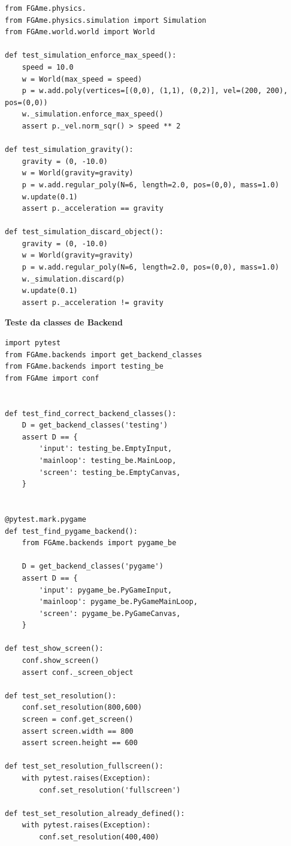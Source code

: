 \begin{anexosenv}
\begin{lstlisting}
from FGAme.physics.
from FGAme.physics.simulation import Simulation
from FGAme.world.world import World

def test_simulation_enforce_max_speed():
    speed = 10.0
    w = World(max_speed = speed)
    p = w.add.poly(vertices=[(0,0), (1,1), (0,2)], vel=(200, 200), pos=(0,0))
    w._simulation.enforce_max_speed()
    assert p._vel.norm_sqr() > speed ** 2

def test_simulation_gravity():
    gravity = (0, -10.0)
    w = World(gravity=gravity)
    p = w.add.regular_poly(N=6, length=2.0, pos=(0,0), mass=1.0)
    w.update(0.1)
    assert p._acceleration == gravity

def test_simulation_discard_object():
    gravity = (0, -10.0)
    w = World(gravity=gravity)
    p = w.add.regular_poly(N=6, length=2.0, pos=(0,0), mass=1.0)
    w._simulation.discard(p)
    w.update(0.1)
    assert p._acceleration != gravity
\end{lstlisting}


{\LARGE \textbf{Teste da classes de Backend}}

\begin{lstlisting}
import pytest
from FGAme.backends import get_backend_classes
from FGAme.backends import testing_be
from FGAme import conf


def test_find_correct_backend_classes():
    D = get_backend_classes('testing')
    assert D == {
        'input': testing_be.EmptyInput,
        'mainloop': testing_be.MainLoop,
        'screen': testing_be.EmptyCanvas,
    }


@pytest.mark.pygame
def test_find_pygame_backend():
    from FGAme.backends import pygame_be

    D = get_backend_classes('pygame')
    assert D == {
        'input': pygame_be.PyGameInput,
        'mainloop': pygame_be.PyGameMainLoop,
        'screen': pygame_be.PyGameCanvas,
    }

def test_show_screen():
    conf.show_screen()
    assert conf._screen_object

def test_set_resolution():
    conf.set_resolution(800,600)
    screen = conf.get_screen()
    assert screen.width == 800
    assert screen.height == 600

def test_set_resolution_fullscreen():
    with pytest.raises(Exception):
        conf.set_resolution('fullscreen')

def test_set_resolution_already_defined():
    with pytest.raises(Exception):
        conf.set_resolution(400,400)


\end{lstlisting}
\end{anexosenv}
